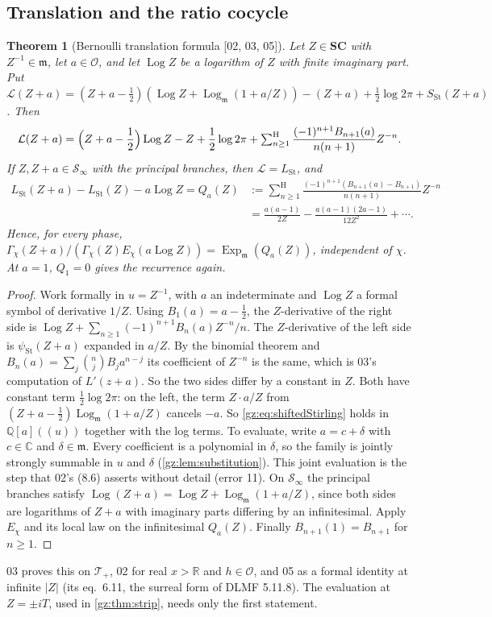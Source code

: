 \documentclass[11pt,a4paper]{article}
\numberwithin{equation}{section}
\newtheorem{theorem}{Theorem}[section]
\theoremstyle{definition}
\theoremstyle{remark}
\newcommand{\SC}{\mathbf{SC}}
\newcommand{\R}{\mathbb R}
\newcommand{\C}{\mathbb C}
\newcommand{\Q}{\mathbb Q}
\newcommand{\OO}{\mathcal O}
\newcommand{\mm}{\mathfrak m}
\newcommand{\Log}{\operatorname{Log}}
\newcommand{\Ex}{\operatorname{Exp}_{\mm}}
\newcommand{\Lgm}{\operatorname{Log}_{\mm}}
\newcommand{\Sh}{\mathop{\textstyle\sum}\nolimits^{\mathrm H}}
\newcommand{\LSt}{L_{\mathrm{St}}}
\newcommand{\SSt}{S_{\mathrm{St}}}
\newcommand{\psiSt}{\psi_{\mathrm{St}}}
\newcommand{\Tp}{\mathcal T_{+}}
\newcommand{\Sinf}{\mathcal S_{\infty}}
\newcommand{\src}[1]{\textup{[#1]}}
\begin{document}
\subsection{Translation and the ratio cocycle}
\begin{theorem}[Bernoulli translation formula \src{02, 03, 05}]\label{gz:thm:translation}
Let $Z\in\SC$ with $Z^{-1}\in\mm$, let $a\in\OO$, and let $\Log Z$ be a
logarithm of $Z$ with finite imaginary part. Put
$\mathcal L(Z+a)=(Z+a-\tfrac12)(\Log Z+\Lgm(1+a/Z))-(Z+a)+\tfrac12\log2\pi+\SSt(Z+a)$.
Then
\begin{equation}\label{gz:eq:shiftedStirling}
\mathcal L(Z+a)=\Bigl(Z+a-\frac12\Bigr)\Log Z-Z+\frac12\log2\pi+\Sh_{n\ge1}\frac{(-1)^{n+1}B_{n+1}(a)}{n(n+1)}Z^{-n}.
\end{equation}
If $Z,Z+a\in\Sinf$ with the principal branches, then $\mathcal L=\LSt$, and
\begin{align*}
\LSt(Z+a)-\LSt(Z)-a\Log Z=Q_a(Z)&:=\Sh_{n\ge1}\frac{(-1)^{n+1}(B_{n+1}(a)-B_{n+1})}{n(n+1)}Z^{-n}\\
&=\frac{a(a-1)}{2Z}-\frac{a(a-1)(2a-1)}{12Z^2}+\cdots .
\end{align*}
Hence, for every phase, $\Gamma_\chi(Z+a)/(\Gamma_\chi(Z)E_\chi(a\Log Z))=\Ex(Q_a(Z))$,
independent of $\chi$. At $a=1$, $Q_1=0$ gives the recurrence again.
\end{theorem}
\begin{proof}
Work formally in $u=Z^{-1}$, with $a$ an indeterminate and $\Log Z$ a
formal symbol of derivative $1/Z$. Using $B_1(a)=a-\tfrac12$, the
$Z$-derivative of the right side is $\Log Z+\sum_{n\ge1}(-1)^{n+1}B_n(a)Z^{-n}/n$.
The $Z$-derivative of the left side is $\psiSt(Z+a)$ expanded in $a/Z$. By
the binomial theorem and $B_n(a)=\sum_j\binom njB_ja^{n-j}$ its coefficient
of $Z^{-n}$ is the same, which is 03's computation of $L'(z+a)$. So the two
sides differ by a constant in $Z$. Both have constant term
$\tfrac12\log2\pi$: on the left, the term $Z\cdot a/Z$ from
$(Z+a-\tfrac12)\Lgm(1+a/Z)$ cancels $-a$. So \eqref{gz:eq:shiftedStirling}
holds in $\Q[a]((u))$ together with the log terms. To evaluate, write $a=c+\delta$
with $c\in\C$ and $\delta\in\mm$. Every coefficient is a polynomial in
$\delta$, so the family is jointly strongly summable in $u$ and $\delta$
(\cref{gz:lem:substitution}). This joint evaluation is the step that 02's
(8.6) asserts without detail (error 11). On $\Sinf$ the principal branches
satisfy $\Log(Z+a)=\Log Z+\Lgm(1+a/Z)$, since both sides are logarithms of
$Z+a$ with imaginary parts differing by an infinitesimal. Apply $E_\chi$ and
its local law on the infinitesimal $Q_a(Z)$. Finally $B_{n+1}(1)=B_{n+1}$
for $n\ge1$.
\end{proof}
03 proves this on $\Tp$, 02 for real $x>\R$ and $h\in\OO$, and 05 as a
formal identity at infinite $|Z|$ (its eq.\ 6.11, the surreal form of DLMF
5.11.8). The evaluation at $Z=\pm iT$, used in \cref{gz:thm:strip}, needs
only the first statement.
\end{document}
